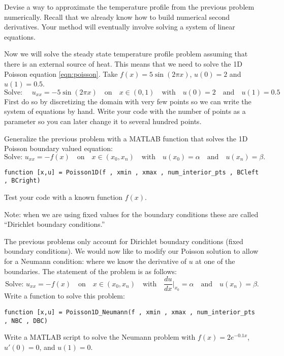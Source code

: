 \begin{problem}
    Devise a way to approximate the temperature profile from the previous problem
    numerically.  Recall that we already know how to build numerical second derivatives.
    Your method will eventually involve solving a system of linear equations.
\end{problem}

\begin{problem}
    Now we will solve the steady state temperature profile problem assuming that there is
    an external source of heat.  This means that we need to solve the 1D Poisson equation
    \eqref{eqn:poisson}.  Take $f(x) = 5\sin(2 \pi x)$, $u(0) = 2$ and $u(1) = 0.5$.
    \[ \text{Solve: } \quad u_{xx} = -5\sin(2\pi x) \quad \text{on} \quad x \in (0,1)
    \quad \text{with} \quad u(0)=2 \quad \text{and} \quad u(1) = 0.5 \]
    First do so by discretizing the domain with very few points so we can write the system
    of equations by hand.  Write your code with the number of points as a parameter so you
    can later change it to several hundred points.
\end{problem}

\begin{problem}
    Generalize the previous problem with a MATLAB function that solves the 1D Poisson
    boundary valued equation:
    \[ \text{Solve: } u_{xx} = - f(x) \quad \text{on} \quad x \in (x_0,x_n) \quad \text{with} \quad
    u(x_0) = \alpha \quad \text{and} \quad u(x_n) = \beta. \]
\begin{lstlisting}
function [x,u] = Poisson1D(f , xmin , xmax , num_interior_pts , BCleft , BCright)
\end{lstlisting}
    Test your code with a known function $f(x)$.

    Note: when we are using fixed values for the boundary conditions these are called
    ``Dirichlet boundary conditions.''
\end{problem}



\begin{problem}
The previous problems only account for Dirichlet boundary conditions (fixed boundary
conditions).  We would now like to modify our Poisson solution to allow for a Neumann
condition: where we know the derivative of $u$ at one of the boundaries.  The
statement of the problem is as follows:
    \[ \text{Solve: } u_{xx} = - f(x) \quad \text{on} \quad x \in (x_0,x_n) \quad \text{with} \quad
    \frac{du}{dx}\Big|_{x_0} = \alpha \quad \text{and} \quad u(x_n) = \beta. \]
    Write a function to solve this problem:
\begin{lstlisting}
function [x,u] = Poisson1D_Neumann(f , xmin , xmax , num_interior_pts , NBC , DBC)
\end{lstlisting}

    Write a MATLAB script to solve the Neumann problem with $f(x) = 2e^{-0.1x}$, $u'(0)=0$,
    and $u(1)=0$.
\end{problem}

